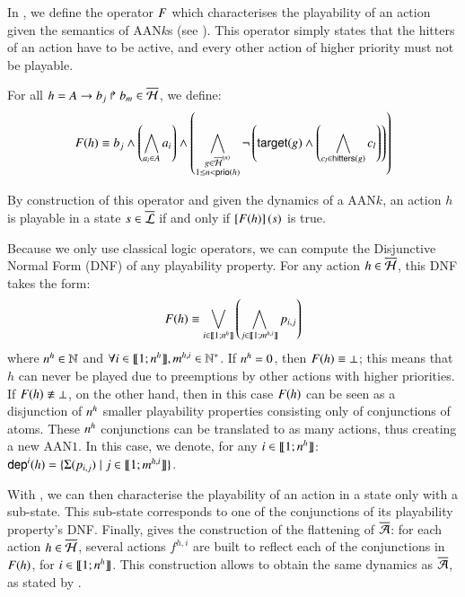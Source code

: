 In , we define the operator $F$ which characterises the playability of an action
given the semantics of AAN$k$s (see ).
This operator simply states that the hitters of an action have to be active,
and every other action of higher priority must not be playable.

\begin{definition}\label{def:fop}
  For all $h = A\rightarrow b_j\Rsh b_m \in \overline{\mathcal{H}}$, we define:
  \[
    F(h) \equiv
    b_j \wedge
    \left(\bigwedge_{a_i \in A} a_i\right)
    \wedge
      \left( \bigwedge_{\substack{g \in \overline{\mathcal{H}}^{(n)}\\1 \leq n < \mathsf{prio}(h)}}
      \neg \left( \mathsf{target}(g) \wedge \left(\bigwedge_{c_l \in \mathsf{hitters}(g)} c_l\right)\right) \right)
  \]
\end{definition}
%
By construction of this operator and given the dynamics of a AAN$k$,
an action $h$ is playable in a state $s \in \overline{\mathcal{L}}$ if and only if
$\left[F(h)\right](s)$ is true.

Because we only use classical logic operators, we can compute the Disjunctive Normal Form (DNF) of any playability property.
For any action $h \in \overline{\mathcal{H}}$, this DNF takes the form:
\[F(h) \equiv \bigvee_{i \in \llbracket 1; n^{h} \rrbracket} \left( \bigwedge_{j \in \llbracket 1; m^{h,i} \rrbracket} p_{i,j} \right)\]
where $n^{h} \in \mathbb{N}$ and $\forall i \in \llbracket 1; n^{h} \rrbracket, m^{h,i} \in \mathbb{N}^*$.
If $n^{h} = 0$, then $F(h) \equiv \bot$; this means that $h$ can never be played
due to preemptions by other actions with higher priorities.
If $F(h) \not\equiv \bot$, on the other hand, then in this case $F(h)$
can be seen as a disjunction of $n^{h}$ smaller playability properties consisting only of conjunctions of atoms.
These $n^{h}$ conjunctions can be translated to as many actions,
thus creating a new AAN$1$.
In this case, we denote, for any $i \in \llbracket 1; n^{h} \rrbracket$:
$\mathsf{dep}^{i}(h) = \{ \Sigma(p_{i,j}) \mid j \in \llbracket 1; m^{h,i} \rrbracket \}$.

With , we can then characterise the playability of an action in a state only with a sub-state.
This sub-state corresponds to one of the conjunctions of its playability property's DNF.
Finally,  gives the construction of the flattening of $\overline{\mathcal{A}}$:
for each action $h \in \overline{\mathcal{H}}$, several actions $f^{h,i}$ are built to reflect each of the conjunctions in $F(h)$,
\ie for $i \in \llbracket 1; n^{h} \rrbracket$.
This construction allows to obtain the same dynamics as $\overline{\mathcal{A}}$, as stated by .

